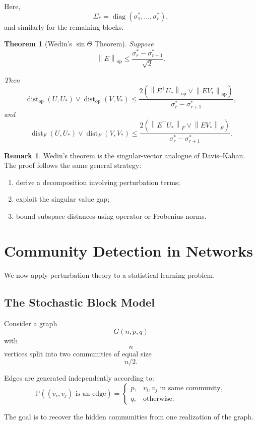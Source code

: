 \documentclass[12pt,oneside]{book}
\numberwithin{equation}{section}
\theoremstyle{definition}
\newtheorem{remark}{Remark}[section]
\theoremstyle{plain}
\newtheorem{theorem}{Theorem}[section]
\theoremstyle{remark}
\newcommand{\Prob}{\mathbb{P}}
\newcommand{\norm}[1]{\left\lVert #1 \right\rVert}
\newcommand{\diag}{\operatorname{diag}}
\begin{document}
Here,
\[
\Sigma_*=\diag(\sigma_1^*,\dots,\sigma_r^*),
\]
and similarly for the remaining blocks.

\begin{theorem}[Wedin's $\sin\Theta$ Theorem]
Suppose
\[
\norm{E}_{\mathrm{op}}
\leq
\frac{\sigma_r^*-\sigma_{r+1}^*}{\sqrt{2}}.
\]

Then
\[
\operatorname{dist}_{\mathrm{op}}(U,U_*)
\vee
\operatorname{dist}_{\mathrm{op}}(V,V_*)
\leq
\frac{
2
\left(
\norm{E^\top U_*}_{\mathrm{op}}
\vee
\norm{EV_*}_{\mathrm{op}}
\right)
}{
\sigma_r^*-\sigma_{r+1}^*
},
\]
and
\[
\operatorname{dist}_F(U,U_*)
\vee
\operatorname{dist}_F(V,V_*)
\leq
\frac{
2
\left(
\norm{E^\top U_*}_F
\vee
\norm{EV_*}_F
\right)
}{
\sigma_r^*-\sigma_{r+1}^*
}.
\]
\end{theorem}

\begin{remark}
Wedin's theorem is the singular-vector analogue of Davis--Kahan. The proof follows the same general strategy:
\begin{enumerate}
\item derive a decomposition involving perturbation terms;
\item exploit the singular value gap;
\item bound subspace distances using operator or Frobenius norms.
\end{enumerate}
\end{remark}

\section{Community Detection in Networks}

We now apply perturbation theory to a statistical learning problem.

\subsection{The Stochastic Block Model}

Consider a graph
\[
G(n,p,q)
\]
with
\[
n
\]
vertices split into two communities of equal size
\[
n/2.
\]

Edges are generated independently according to:
\[
\Prob((v_i,v_j)\text{ is an edge})
=
\begin{cases}
p, & v_i,v_j \text{ in same community},\\
q, & \text{otherwise}.
\end{cases}
\]

The goal is to recover the hidden communities from one realization of the graph.
\end{document}
